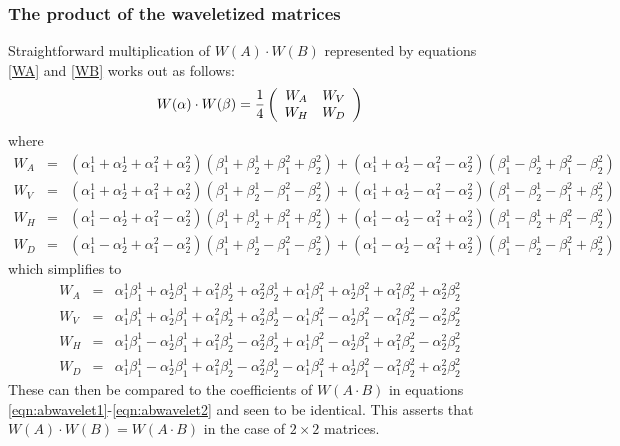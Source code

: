 \subsubsection{The product of the waveletized matrices}

Straightforward multiplication of $W(A) \cdot W(B)$ represented by equations \ref{WA} and \ref{WB} works out as follows:
\[
W(\alpha) \cdot W(\beta) = 
{1 \over 4} 
\left(
\begin{array}{cc}
W_A & W_V \\
W_H & W_D
\end{array}
\right)
\]
where
\begin{eqnarray*}
W_A &=& (\alpha^1_1 + \alpha^1_2 + \alpha^2_1 + \alpha^2_2)( \beta^1_1 + \beta^1_2 + \beta^2_1 + \beta^2_2) + (\alpha^1_1 +\alpha^1_2 -\alpha^2_1 -\alpha^2_2)(\beta^1_1 - \beta^1_2 + \beta^2_1 - \beta^2_2) \\
W_V &=& (\alpha^1_1 +\alpha^1_2 +\alpha^2_1 +\alpha^2_2) ( \beta^1_1 + \beta^1_2 - \beta^2_1 - \beta^2_2) + (\alpha^1_1 +\alpha^1_2 -\alpha^2_1 -\alpha^2_2) ( \beta^1_1 - \beta^1_2 - \beta^2_1 + \beta^2_2)  \\
W_H &=&  (\alpha^1_1 -\alpha^1_2 +\alpha^2_1 -\alpha^2_2)(\beta^1_1 + \beta^1_2 + \beta^2_1 + \beta^2_2) +  (\alpha^1_1 -\alpha^1_2 -\alpha^2_1 +\alpha^2_2 ) (\beta^1_1 - \beta^1_2 + \beta^2_1 - \beta^2_2) \\
W_D &=& (\alpha^1_1 -\alpha^1_2 +\alpha^2_1 -\alpha^2_2) (\beta^1_1 + \beta^1_2 - \beta^2_1 - \beta^2_2)+(\alpha^1_1 -\alpha^1_2 -\alpha^2_1 +\alpha^2_2 )(\beta^1_1 - \beta^1_2 - \beta^2_1 + \beta^2_2)
\end{eqnarray*}
which simplifies to
\begin{eqnarray*}
W_A &=&\alpha^1_1 \beta^1_1 +\alpha^1_2 \beta^1_1 +\alpha^2_1 \beta^1_2 +\alpha^2_2 \beta^1_2 +\alpha^1_1 \beta^2_1 +\alpha^1_2 \beta^2_1 +\alpha^2_1 \beta^2_2 +\alpha^2_2 \beta^2_2 \\
W_V &=& \alpha^1_1 \beta^1_1 +\alpha^1_2 \beta^1_1 +\alpha^2_1 \beta^1_2 +\alpha^2_2 \beta^1_2 -\alpha^1_1 \beta^2_1 -\alpha^1_2 \beta^2_1 -\alpha^2_1 \beta^2_2 -\alpha^2_2 \beta^2_2 \\
W_H &=&\alpha^1_1 \beta^1_1 -\alpha^1_2 \beta^1_1 +\alpha^2_1 \beta^1_2 -\alpha^2_2 \beta^1_2 +\alpha^1_1 \beta^2_1 -\alpha^1_2 \beta^2_1 +\alpha^2_1 \beta^2_2 -\alpha^2_2 \beta^2_2 \\
W_D &=&\alpha^1_1 \beta^1_1 -\alpha^1_2 \beta^1_1 +\alpha^2_1 \beta^1_2 -\alpha^2_2 \beta^1_2 -\alpha^1_1 \beta^2_1 +\alpha^1_2 \beta^2_1 -\alpha^2_1 \beta^2_2 +\alpha^2_2 \beta^2_2 
\end{eqnarray*}
These can then be compared to the coefficients of $W(A \cdot B)$ in equations \ref{eqn:abwavelet1}-\ref{eqn:abwavelet2} and seen to be identical. This asserts that $W(A) \cdot W(B) = W(A \cdot B)$ in the case of $2 \times 2$ matrices.


